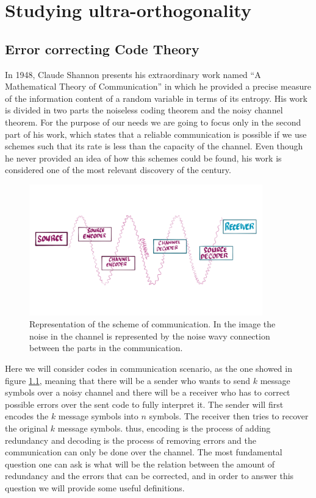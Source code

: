 \chapter{Studying ultra-orthogonality}

\section{Error correcting Code Theory}
In 1948, Claude Shannon presents his extraordinary work named ``A Mathematical Theory of Communication'' \cite{shannon_mathematical_1948} in which he provided a precise measure of the information content of a random variable in terms of its entropy.  His work is divided in two parts the noiseless coding theorem and the noisy channel theorem. For the purpose of our needs we are going to focus only in the second part of his work, which states that a reliable communication is possible if we use schemes such that its rate is less than the capacity of the channel. Even though he never provided an idea of how this schemes could be found, his work is considered one of the most relevant discovery of the century.
\begin{figure}
\centering
\includegraphics[width=0.9\textwidth]{Figures/Source_Destination.png}
\caption{Representation of the scheme of communication. In the image the noise in the channel is represented by the noise wavy connection between the parts in the communication. }
\label{CH2:Channel_communication}
\end{figure}
\indent Here we will consider codes in communication scenario, as the one showed in figure \ref{CH2:Channel_communication}, meaning that there will be a sender who wants to send $k$ message symbols over a noisy channel and there will be a receiver who has to correct possible errors over the sent code to fully interpret it. The sender will first encodes the $k$ message symbols into $n$ symbols. The receiver then tries to recover the original $k$ message symbols. thus, encoding is the process of adding redundancy and decoding is the process of removing errors and the communication can only be done over the channel\cite{mackay_information_2003}. The most fundamental question one can ask is what will be the relation between the amount of redundancy and the errors that can be corrected, and in order to answer this question we will provide some useful definitions.
